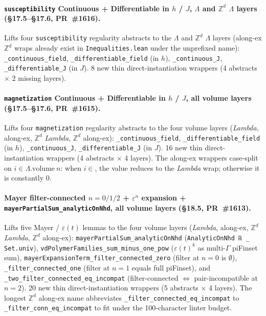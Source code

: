 \documentclass[a4paper,11pt]{article}
\begin{document}
\paragraph{\texttt{susceptibility} Continuous + Differentiable in
$h$ / $J$, $\Lambda$ and $\mathbb{Z}^d$ $\Lambda$ layers (\S17.5--\S17.6,
PR~\#1616).} Lifts four \texttt{susceptibility} regularity
abstracts to the $\Lambda$ and $\mathbb{Z}^d$ $\Lambda$ layers
(along-ex $\mathbb{Z}^d$ wraps already exist in
\texttt{Inequalities.lean} under the unprefixed name):
\texttt{\_continuous\_field}, \texttt{\_differentiable\_field}
(in $h$), \texttt{\_continuous\_J},
\texttt{\_differentiable\_J} (in $J$). 8 new thin
direct-instantiation wrappers (4 abstracts $\times$ 2 missing
layers).

\paragraph{\texttt{magnetization} Continuous + Differentiable in
$h$ / $J$, all volume layers (\S17.5--\S17.6, PR~\#1615).} Lifts
four \texttt{magnetization} regularity abstracts to the four
volume layers (\textit{Lambda}, along-ex, $\mathbb{Z}^d$ \textit{Lambda},
$\mathbb{Z}^d$ along-ex):
\texttt{\_continuous\_field}, \texttt{\_differentiable\_field}
(in $h$),
\texttt{\_continuous\_J}, \texttt{\_differentiable\_J} (in $J$).
16 new thin direct-instantiation wrappers (4 abstracts $\times$
4 layers). The along-ex wrappers case-split on
$i \in \Lambda.\mathrm{volume}\ n$: when $i \in$, the value
reduces to the \textit{Lambda} wrap; otherwise it is constantly $0$.

\paragraph{Mayer filter-connected $n=0/1/2$ + $\varepsilon^n$
expansion + \texttt{mayerPartialSum\_analyticOnNhd}, all volume
layers (\S18.5, PR~\#1613).} Lifts five Mayer / $\varepsilon(t)$
lemmas to the four volume layers (\textit{Lambda}, along-ex,
$\mathbb{Z}^d$ \textit{Lambda}, $\mathbb{Z}^d$ along-ex):
\texttt{mayerPartialSum\_analyticOnNhd}
(\texttt{AnalyticOnNhd ℝ \_ Set.univ}),
\texttt{vdPolymerFamilies\_sum\_minus\_one\_pow}
($\varepsilon(t)^k$ as multi-$\Gamma$ piFinset sum),
\texttt{mayerExpansionTerm\_filter\_connected\_zero}
(filter at $n=0$ is $\emptyset$),
\texttt{\_filter\_connected\_one} (filter at $n=1$ equals full
piFinset), and \texttt{\_two\_filter\_connected\_eq\_incompat}
(filter-connected $\Leftrightarrow$ pair-incompatible at $n=2$).
20 new thin direct-instantiation wrappers (5 abstracts $\times$
4 layers). The longest $\mathbb{Z}^d$ along-ex name
abbreviates \texttt{\_filter\_connected\_eq\_incompat} to
\texttt{\_filter\_conn\_eq\_incompat} to fit under the
100-character linter budget.
\end{document}
